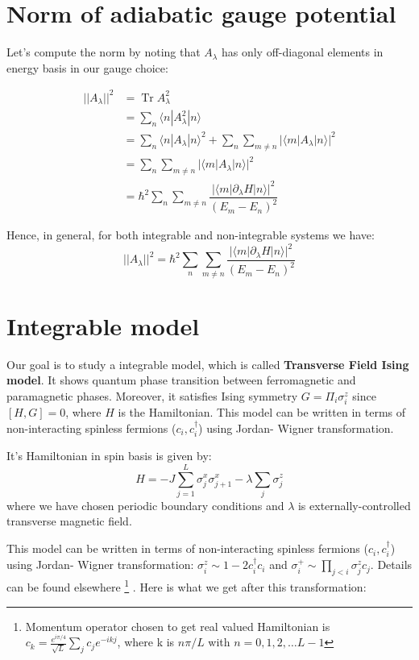 \documentclass[11pt,a4paper]{article}
\DeclareMathOperator{\Tr}{Tr}
\begin{document}
\section{Norm of adiabatic gauge potential}
Let's compute the norm by noting that $A_{\lambda}$ has only off-diagonal elements in energy basis in our gauge choice:

\begin{align}
||A_{\lambda}||^2 &= \Tr  A_{\lambda}^2 \\
&= \sum_n \langle n | A^2_{\lambda}| n \rangle \\
&= \sum_{n} \langle n | A_{\lambda}| n \rangle ^2 + \sum_n \sum_{m \neq n}  |\langle m | A_{\lambda}| n \rangle|^2 \\
&=  \sum_n \sum_{m \neq n}  |\langle m | A_{\lambda}| n \rangle|^2 \\
&= \hbar^2 \sum_n \sum_{m \neq n}  \dfrac{|\langle m | \partial_{\lambda}H| n \rangle|^2}{(E_m-E_n)^2} 
\end{align}

Hence, in general, for both integrable and non-integrable systems we have: 
\begin{equation}
\boxed{||A_{\lambda}||^2 = \hbar^2\sum_n \sum_{m \neq n}  \dfrac{|\langle m | \partial_{\lambda}H| n \rangle|^2}{(E_m-E_n)^2} }
\end{equation}


\section{Integrable model}
Our goal is to study a integrable model, which is called \textbf{Transverse Field Ising model}. It shows quantum phase transition between ferromagnetic and paramagnetic phases. Moreover, it satisfies Ising symmetry $G= \Pi_i \sigma_i^z$ since $[H, G]=0$, where $H$ is the Hamiltonian.
This model can be written in terms of non-interacting spinless fermions ($c_i, c^{\dagger}_i $) using Jordan- Wigner transformation. 

It's Hamiltonian in spin basis is given by:
\begin{equation}
H= -J \sum_{j=1}^{L} \sigma_j^x \sigma_{j+1}^x - \lambda \sum_{j} \sigma_j^z 
\label{xx_z}
\end{equation}
where we have chosen periodic boundary conditions and $\lambda$ is externally-controlled transverse magnetic field.

This model can be written in terms of non-interacting spinless fermions ($c_i, c^{\dagger}_i $) using Jordan- Wigner transformation: $\sigma_i^z \sim 1 - 2 c^{\dagger}_i c_i   $ and $\sigma_i^+ \sim \prod_{j<i} \sigma_j^z c_j   $. Details can be found elsewhere \cite{sachdev2007quantum} \footnote{Momentum operator chosen to get real valued Hamiltonian is $c_k= \frac{e^{i \pi/4}}{\sqrt{L}}\sum_j c_j e^{-ikj}$, where k is $n\pi/L$ with $n=0,1,2, \ldots L-1$} . Here is what we get after this transformation:
\end{document}
